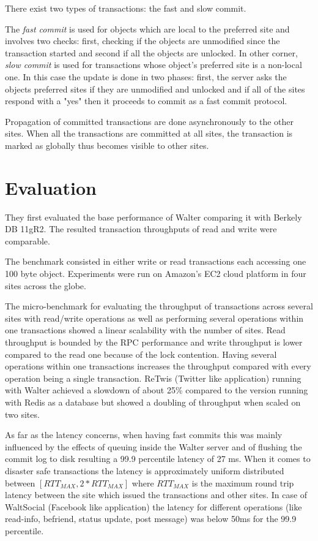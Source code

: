 \documentclass[a4paper]{article}
\begin{document}
There exist two types of transactions: the fast and slow commit. 

The \textit{fast commit} is used for objects which are local to the preferred site and involves two checks: first, checking if the objects are unmodified since the transaction started and second if all the objects are unlocked. 
In other corner, \textit{slow commit} is used for transactions whose object's preferred site is a non-local one. In this case the update is done in two phases: first, the server asks the objects preferred sites if they are unmodified and unlocked and if all of the sites respond with a "yes" then it proceeds to commit as a fast commit protocol. %

Propagation of committed transactions are done asynchronously to the other sites. When all the transactions are committed at all sites, the transaction is marked as globally thus becomes visible to other sites. 

\section{Evaluation}

They first evaluated the base performance of Walter comparing it with Berkely DB 11gR2. The resulted transaction throughputs of read and write were comparable.

The benchmark consisted in either write or read transactions each accessing one 100 byte object. Experiments were run on Amazon's EC2 cloud platform in four sites across the globe. 

The micro-benchmark for evaluating the throughput of transactions across several sites with read/write operations as well as performing several operations within one transactions showed a linear scalability with the number of sites. Read throughput is bounded by the RPC performance and write throughput is lower compared to the read one because of the lock contention. Having several operations within one transactions increases the throughput compared with every operation being a single transaction. ReTwis (Twitter like application) running with Walter achieved a slowdown of about 25\% compared to the version running with Redis as a database but showed a doubling of throughput when scaled on two sites. 

As far as the latency concerns, when having fast commits this was mainly influenced by the effects of queuing inside the Walter server and of flushing the commit log to disk resulting a 99.9 percentile latency of 27 ms. When it comes to disaster safe transactions the latency is approximately uniform distributed between $[RTT_{MAX},2*RTT_{MAX}]$ where $RTT_{MAX}$ is the maximum round trip latency between the site which issued the transactions and other sites.
In case of WaltSocial (Facebook like application) the latency for different operations (like read-info, befriend, status update, post message) was below 50ms for the 99.9 percentile.
\end{document}
